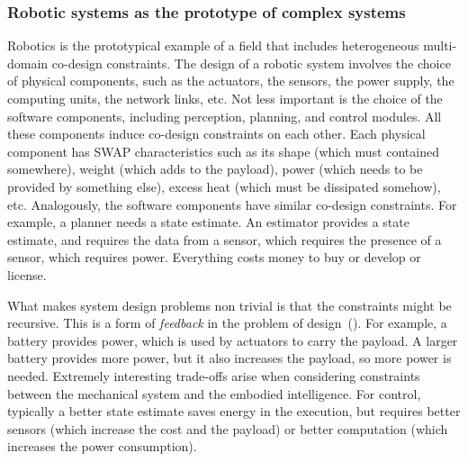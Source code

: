 \subsubsection*{Robotic systems as the prototype of complex systems}

Robotics is the prototypical example of a field that includes heterogeneous
multi-domain co-design constraints. The design of a robotic system
involves the choice of physical components, such as the actuators,
the sensors, the power supply, the computing units, the network links,
etc. Not less important is the choice of the software components,
including perception, planning, and control modules. All these components
induce co-design constraints on each other. Each physical component
has SWAP characteristics such as its shape (which must contained somewhere),
weight (which adds to the payload), power (which needs to be provided
by something else), excess heat (which must be dissipated somehow),
etc. Analogously, the software components have similar co-design constraints.
For example, a planner needs a state estimate. An estimator provides
a state estimate, and requires the data from a sensor, which requires
the presence of a sensor, which requires power. Everything costs money
to buy or develop or license. 

What makes system design problems non trivial is that the constraints
might be recursive. This is a form of \emph{feedback} in the problem
of design~(). For example, a battery provides power,
which is used by actuators to carry the payload. A larger battery
provides more power, but it also increases the payload, so more power
is needed. Extremely interesting trade-offs arise when considering
constraints between the mechanical system and the embodied intelligence.
For control, typically a better state estimate saves energy in the
execution, but requires better sensors (which increase the cost and
the payload) or better computation (which increases the power consumption). 

